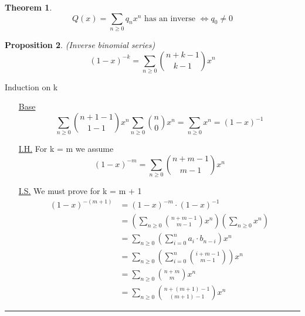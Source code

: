 \documentclass{article}
\newcounter{lecnum}
\newtheorem{theorem}{Theorem}[lecnum]
\newtheorem{prop}[theorem]{Proposition}
\newenvironment{proof}{{\bf Proof:}}{\hfill\rule{2mm}{2mm}}
\begin{document}
\begin{theorem}
\[Q(x) = \sum_{n \geq 0} q_n x^n \text{ has an inverse } \iff q_0 \neq 0\]
\end{theorem}

\begin{prop}
(Inverse binomial series) 
\[(1 - x)^{-k} = \sum_{n \geq 0} {{n + k - 1} \choose {k -1}} x^n\]
\end{prop}

\begin{proof} Induction on k \\
\begin{itemize}
\item [\underline{Base}] \[\sum_{n \geq 0} {{n + 1 - 1} \choose 1 - 1} x ^n \sum_{n \geq 0} {n \choose 0}x^n = \sum_{n \geq 0} x^n = (1 -x ) ^{-1} \]
\item [\underline{I.H.}]  For k = m we assume 
\[(1 -x)^{-m} = \sum_{n \geq 0} {{n + m - 1} \choose {m - 1}} x^n\]
\item [\underline{I.S.}] We must prove for k = m + 1
\[\begin{aligned}
(1 - x) ^{- (m + 1)} & = ( 1 - x) ^ {-m} \cdot ( 1- x) ^{-1} \\
& = \left( \sum_{n \geq 0} {{n + m -1} \choose {m - 1}} x^n \right) \left( \sum_{n \geq 0} x^n \right) \\
& = \sum_{n \geq 0} \left(\sum_{i = 0}^{n} a_i \cdot b_{n -i} \right) x^n \\
& = \sum_{n \geq 0} \left( \sum_{i = 0}^{n} {{i + m -1} \choose {m-1}} \right) x^n \\
& = \sum_{n \geq 0} {{n + m} \choose {m}} x^n \\
& = \sum_{n \geq 0} {{n + (m + 1) - 1} \choose {(m+1) - 1}} x^n 
\end{aligned}\]
\end{itemize}


\end{proof}
\end{document}

